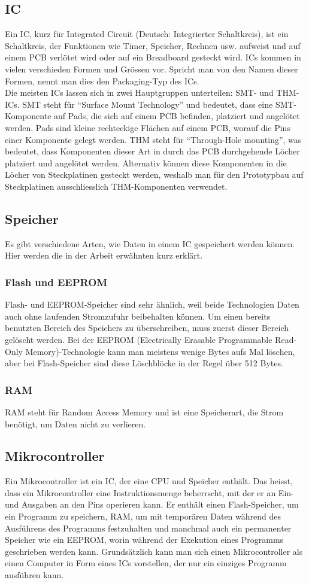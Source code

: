 \documentclass[12pt, a4paper]{report}
\begin{document}
\subsection{IC}
Ein IC, kurz für Integrated Circuit (Deutsch: Integrierter Schaltkreis), ist ein Schaltkreis, der Funktionen wie Timer, Speicher, Rechnen usw. aufweist und auf einem PCB verlötet wird oder auf ein Breadboard gesteckt wird. ICs kommen in vielen verschieden Formen und Grössen vor. Spricht man von den Namen dieser Formen, nennt man dies den Packaging-Typ des ICs.
\\[\medskipamount]
Die meisten ICs lassen sich in zwei Hauptgruppen unterteilen: SMT- und THM-ICs. SMT steht für ``Surface Mount Technology'' und bedeutet, dass eine SMT-Komponente auf Pads, die sich auf einem PCB befinden, platziert und angelötet werden. Pads sind kleine rechteckige Flächen auf einem PCB, worauf die Pins einer Komponente gelegt werden. THM steht für ``Through-Hole mounting'', was bedeutet, dass Komponenten dieser Art in durch das PCB durchgehende Löcher platziert und angelötet werden. Alternativ können diese Komponenten in die Löcher von Steckplatinen gesteckt werden, weshalb man für den Prototypbau auf Steckplatinen ausschliesslich THM-Komponenten verwendet.
\subsection{Speicher}
Es gibt verschiedene Arten, wie Daten in einem IC gespeichert werden können. Hier werden die in der Arbeit erwähnten kurz erklärt.
\subsubsection{Flash und EEPROM}
Flash- und EEPROM-Speicher sind sehr ähnlich, weil beide Technologien Daten auch ohne laufenden Stromzufuhr beibehalten können. Um einen bereits benutzten Bereich des Speichers zu überschreiben, muss zuerst dieser Bereich gelöscht werden. Bei der EEPROM (Electrically Erasable Programmable Read-Only Memory)-Technologie kann man meistens wenige Bytes aufs Mal löschen, aber bei Flash-Speicher sind diese Löschblöcke in der Regel über 512 Bytes.
\subsubsection{RAM}
RAM steht für Random Access Memory und ist eine Speicherart, die Strom benötigt, um Daten nicht zu verlieren.
\subsection{Mikrocontroller}
Ein Mikrocontroller ist ein IC, der eine CPU und Speicher enthält. Das heisst, dass ein Mikrocontroller eine Instruktionsmenge beherrscht, mit der er an Ein- und Ausgaben an den Pins operieren kann. Er enthält einen Flash-Speicher, um ein Programm zu speichern, RAM, um mit temporären Daten während des Ausführens des Programms festzuhalten und manchmal auch ein permanenter Speicher wie ein EEPROM, worin während der Exekution eines Programms geschrieben werden kann. Grundsätzlich kann man sich einen Mikrocontroller als einen Computer in Form eines ICs vorstellen, der nur ein einziges Programm ausführen kann.
\end{document}
